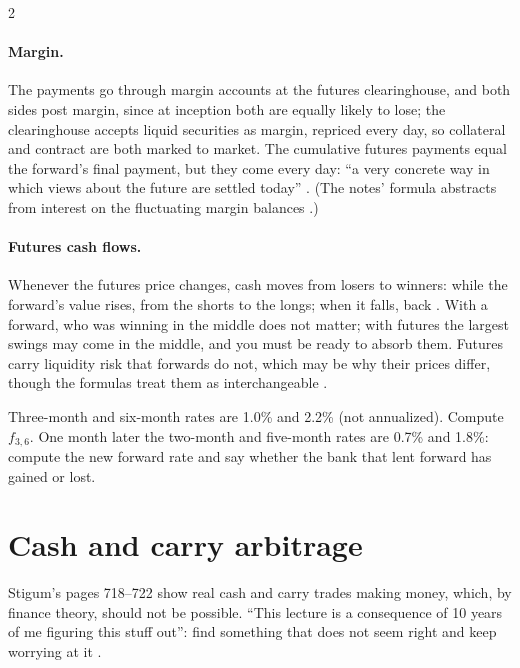 \begin{paracol}{2}
\paragraph{Margin.} The payments go through margin accounts at the futures clearinghouse, and both sides post margin, since at inception both are equally likely to lose; the clearinghouse
accepts liquid securities as margin, repriced every day, so collateral and contract are both marked to market. The cumulative futures payments equal the forward's final payment, but they come
every day: ``a very concrete way in which views about the future are settled today'' . (The notes' formula abstracts from interest on the fluctuating margin balances .)

\paragraph{Futures cash flows.} Whenever the futures price changes, cash moves from losers to winners: while the forward's value rises, from the shorts to the
longs; when it falls, back . With a forward, who was winning in the middle does
not matter; with futures the largest swings may come in the middle, and you must be ready to absorb them. Futures carry liquidity risk that forwards do not, which
may be why their prices differ, though the formulas treat them as interchangeable .

\begin{exercise}
Three-month and six-month rates are 1.0\% and 2.2\% (not annualized). Compute $f_{3,6}$. One month later the two-month and five-month rates are 0.7\% and 1.8\%: compute
the new forward rate and say whether the bank that lent forward has gained or lost.
\end{exercise}

\section{Cash and carry arbitrage}\label{sec:ff-cashcarry}

\begin{aside}
Stigum's pages 718--722 show real cash and carry trades making money, which, by finance theory, should not be possible. ``This lecture is a consequence of 10 years
of me figuring this stuff out'': find something that does not seem right and keep worrying at it .
\end{aside}


\end{paracol}
